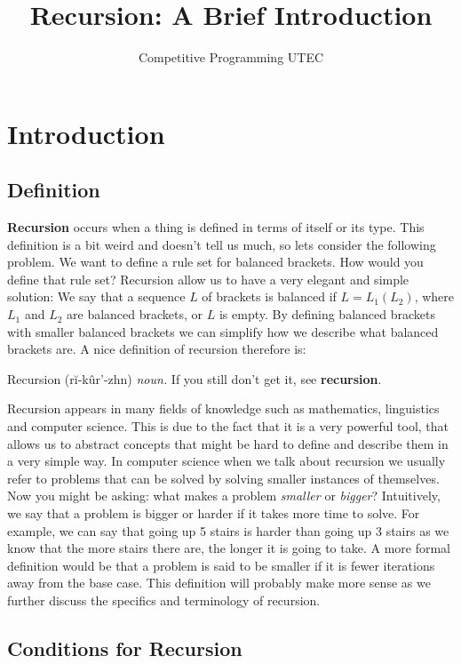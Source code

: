 \documentclass{article}
\title{Recursion: A Brief Introduction}
\author{Competitive Programming UTEC}
\begin{document}
\maketitle

\section{Introduction}

\subsection{Definition}

\textbf{Recursion} occurs when a thing is defined in terms of itself or its type. This definition is a bit weird and doesn't tell us much, so lets consider the following problem. We want to define a rule set for balanced brackets. How would you define that rule set? Recursion allow us to have a very elegant and simple solution: We say that a sequence $L$ of brackets is balanced if $L = L_1(L_2)$, where $L_1$ and $L_2$ are balanced brackets, or $L$ is empty. By defining balanced brackets with smaller balanced brackets we can simplify how we describe what balanced brackets are. A nice definition of recursion therefore is:

\begin{center}
	\parbox{0.7\linewidth}{Recursion (rĭ-kûr’-zhn) \textit{noun.} If you still don't get it, see \textbf{recursion}.}
\end{center}

Recursion appears in many fields of knowledge such as mathematics, linguistics and computer science. This is due to the fact that it is a very powerful tool, that allows us to abstract concepts that might be hard to define and describe them in a very simple way. In computer science when we talk about recursion we usually refer to problems that can be solved by solving smaller instances of themselves. Now you might be asking: what makes a problem \textit{smaller} or \textit{bigger}? Intuitively, we say that a problem is bigger or harder if it takes more time to solve. For example, we can say that going up 5 stairs is harder than going up 3 stairs as we know that the more stairs there are, the longer it is going to take. A more formal definition would be that a problem is said to be smaller if it is fewer iterations away from the base case. This definition will probably make more sense as we further discuss the specifics and terminology of recursion.

\subsection{Conditions for Recursion}
\end{document}
